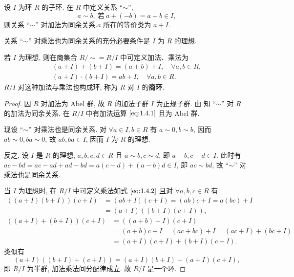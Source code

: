 \documentclass[../../main.tex]{subfiles}
\begin{document}
\begin{theorem}\label{theorem:抽象代数-定理 1.4.1}
设 \( I \) 为环 \( R \) 的子环. 在 \( R \) 中定义关系 “\(\sim\)”,
\[
a \sim b, \ 若\ a + (-b) = a - b \in I,
\]
则关系 “\(\sim\)” 对加法为同余关系.\( a \) 所在的等价类为 \( a + I \).

关系 “\(\sim\)” 对乘法也为同余关系的充分必要条件是 \( I \) 为 \( R \) 的理想.

若 \( I \) 为理想, 则在商集合 \( R/\sim = R/I \) 中可定义加法、乘法为
\begin{gather}
(a + I) + (b + I) = (a + b) + I, \quad \forall a,b \in R, \label{eq:1.4.1}
\\
(a + I) \cdot (b + I) = ab + I, \quad \forall a,b \in R. \label{eq:1.4.2}
\end{gather}
\( R/I \) 对这种加法与乘法也构成环, 称为 \( R \) 对 \( I \) 的\textbf{商环}.
\end{theorem}
\begin{proof}
因 \( R \) 对加法为 Abel 群, 故 \( R \) 的加法子群 \( I \) 为正规子群. 由 知 “\(\sim\)” 对 \( R \) 的加法为同余关系, 在 \( R/I \) 中有加法运算 \(\eqref{eq:1.4.1}\) 且为 Abel 群.

现设 “\(\sim\)” 对乘法也是同余关系. 对 \( \forall a \in I, b \in R \) 有 \( a \sim 0, b \sim b \), 因而 \( ab \sim 0, ba \sim 0 \), 故 \( ab, ba \in I \), 因而 \( I \) 为 \( R \) 的理想.

反之, 设 \( I \) 是 \( R \) 的理想, \( a,b,c,d \in R \) 且 \( a \sim b, c \sim d \), 即 \( a - b, c - d \in I \). 此时有 \( ac - bd = ac - ad + ad - bd = a(c - d) + (a - b)d \in I \), 即 \( ac \sim bd \), 故 “\(\sim\)” 对乘法也是同余关系.

当 \( I \) 为理想时, 在 \( R/I \) 中可定义乘法如式 \(\eqref{eq:1.4.2}\) 且对 \( \forall a,b,c \in R \) 有
\begin{align*}
((a + I)(b + I))(c + I) &= (ab + I)(c + I) = (ab)c + I = a(bc) + I \\
&= (a + I)((b + I)(c + I)),
\end{align*}
\begin{align*}
((a + I) + (b + I))(c + I) &= ((a + b) + I)(c + I) \\
&= (a + b)c + I = (ac + bc) + I = (ac + I) + (bc + I) \\
&= (a + I)(c + I) + (b + I)(c + I).
\end{align*}
类似有
\[
(a + I)((b + I) + (c + I)) = (a + I)(b + I) + (a + I)(c + I),
\]
即 \( R/I \) 为半群, 加法乘法间分配律成立. 故 \( R/I \) 是一个环.
\end{proof}
\end{document}
